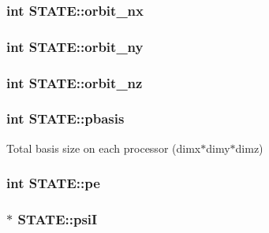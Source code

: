 \hypertarget{struct_s_t_a_t_e_aa94927b5a219d420966a5990475eaf1f}{
\subsubsection[{orbit\-\_\-nx}]{\setlength{\rightskip}{0pt plus 5cm}int S\-T\-A\-T\-E\-::orbit\-\_\-nx}}\label{struct_s_t_a_t_e_aa94927b5a219d420966a5990475eaf1f}
\hypertarget{struct_s_t_a_t_e_abccc3277278c0487d6f883c927253a7e}{
\subsubsection[{orbit\-\_\-ny}]{\setlength{\rightskip}{0pt plus 5cm}int S\-T\-A\-T\-E\-::orbit\-\_\-ny}}\label{struct_s_t_a_t_e_abccc3277278c0487d6f883c927253a7e}
\hypertarget{struct_s_t_a_t_e_a3cffb85b144ec7959171b756a61f8071}{
\subsubsection[{orbit\-\_\-nz}]{\setlength{\rightskip}{0pt plus 5cm}int S\-T\-A\-T\-E\-::orbit\-\_\-nz}}\label{struct_s_t_a_t_e_a3cffb85b144ec7959171b756a61f8071}
\hypertarget{struct_s_t_a_t_e_a34c6d92691fcdee11f86fafe2a4e84f3}{
\subsubsection[{pbasis}]{\setlength{\rightskip}{0pt plus 5cm}int S\-T\-A\-T\-E\-::pbasis}}\label{struct_s_t_a_t_e_a34c6d92691fcdee11f86fafe2a4e84f3}
Total basis size on each processor (dimx$\ast$dimy$\ast$dimz) \hypertarget{struct_s_t_a_t_e_a1df3468929a5be1abb9598902c5dde0d}{
\subsubsection[{pe}]{\setlength{\rightskip}{0pt plus 5cm}int S\-T\-A\-T\-E\-::pe}}\label{struct_s_t_a_t_e_a1df3468929a5be1abb9598902c5dde0d}
\hypertarget{struct_s_t_a_t_e_a5e492bb5240028ad91cfa98e16a37da2}{
\subsubsection[{psi\-I}]{ $\ast$ S\-T\-A\-T\-E\-::psi\-I}}\label{struct_s_t_a_t_e_a5e492bb5240028ad91cfa98e16a37da2}
